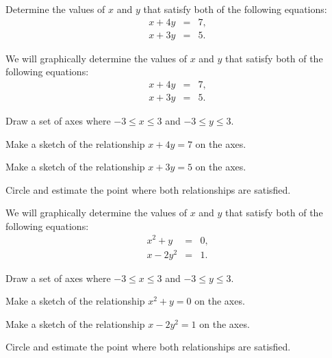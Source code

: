 \begin{problem}
\item Determine the values of $x$ and $y$ that satisfy both of the
  following equations:
  \begin{eqnarray*}
    x + 4y & = & 7, \\
    x + 3y & = & 5.
  \end{eqnarray*}
\end{problem}


\begin{problem}
\item We will graphically determine the values of $x$ and $y$ that
  satisfy both of the following equations:
  \begin{eqnarray*}
    x + 4y & = & 7, \\
    x + 3y & = & 5.
  \end{eqnarray*}
  \begin{subproblem}
  \item Draw a set of axes where $-3\leq x \leq 3$ and $-3 \leq y \leq
    3$. 


    \vfill

  \item Make a sketch of the relationship $x+4y=7$ on the axes.
  \item Make a sketch of the relationship $x+3y=5$ on the axes.
  \item Circle and estimate the point where both relationships are
    satisfied.
  \end{subproblem}

  \clearpage

\item We will graphically determine the values of $x$ and $y$ that
  satisfy both of the following equations:
  \begin{eqnarray*}
    x^2 + y  & = & 0, \\
    x - 2y^2 & = & 1.
  \end{eqnarray*}

  \begin{subproblem}
  \item Draw a set of axes where $-3\leq x \leq 3$ and $-3 \leq y \leq
    3$. 


    \vfill

  \item Make a sketch of the relationship $x^2+y=0$ on the axes.
  \item Make a sketch of the relationship $x-2y^2=1$ on the axes.
  \item Circle and estimate the point where both relationships are
    satisfied.
  \end{subproblem}


\end{problem}

